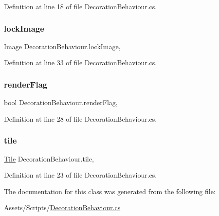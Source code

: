 Definition at line 18 of file Decoration\+Behaviour.\+cs.

\mbox{\label{class_decoration_behaviour_afdf4d387bacdf9075944663410c189f0}} 
\subsubsection{\texorpdfstring{lockImage}{lockImage}}
{\footnotesize\ttfamily Image Decoration\+Behaviour.\+lock\+Image\hspace{0.3cm}{\ttfamily [get]}, {\ttfamily [set]}}



Definition at line 33 of file Decoration\+Behaviour.\+cs.

\mbox{\label{class_decoration_behaviour_a683b77b56bcac3f59bde61021b1592c0}} 
\subsubsection{\texorpdfstring{renderFlag}{renderFlag}}
{\footnotesize\ttfamily bool Decoration\+Behaviour.\+render\+Flag\hspace{0.3cm}{\ttfamily [get]}, {\ttfamily [set]}}



Definition at line 28 of file Decoration\+Behaviour.\+cs.

\mbox{\label{class_decoration_behaviour_ae1f553f396cbb145d7e5c8724c0d24a0}} 
\subsubsection{\texorpdfstring{tile}{tile}}
{\footnotesize\ttfamily \mbox{\hyperlink{class_tile}{Tile}} Decoration\+Behaviour.\+tile\hspace{0.3cm}{\ttfamily [get]}, {\ttfamily [set]}}



Definition at line 23 of file Decoration\+Behaviour.\+cs.



The documentation for this class was generated from the following file\+:\begin{DoxyCompactItemize}
\item 
Assets/\+Scripts/\mbox{\hyperlink{_decoration_behaviour_8cs}{Decoration\+Behaviour.\+cs}}\end{DoxyCompactItemize}
